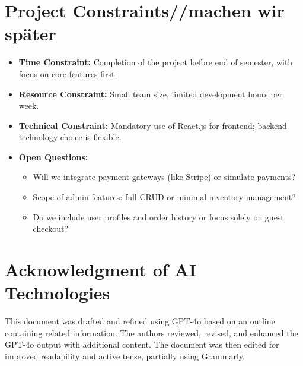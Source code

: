 \documentclass[a4paper,12pt]{article.cls}
\begin{document}
	\section{Project Constraints//machen wir später }
	\begin{itemize}
		\item \textbf{Time Constraint:} Completion of the project before end of semester, with focus on core features first.
		\item \textbf{Resource Constraint:} Small team size, limited development hours per week.
		\item \textbf{Technical Constraint:} Mandatory use of React.js for frontend; backend technology choice is flexible.
		\item \textbf{Open Questions:}
		\begin{itemize}
			\item Will we integrate payment gateways (like Stripe) or simulate payments?
			\item Scope of admin features: full CRUD or minimal inventory management?
			\item Do we include user profiles and order history or focus solely on guest checkout?
		\end{itemize}
	\end{itemize}
	
	\section{Acknowledgment of AI Technologies}
	This document was drafted and refined using GPT-4o based on an outline containing related information. The authors reviewed, revised, and enhanced the GPT-4o output with additional content. The document was then edited for improved readability and active tense, partially using Grammarly.
	
\end{document}
